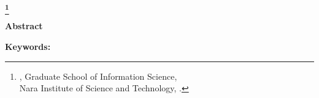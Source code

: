 \begin{center}
 \renewcommand{\thefootnote}{\fnsymbol{footnote}}
 \Large\bfseries \etitle\footnote[1]
 {{\edoctitle}, Graduate School of Information \mbox{Science,}\\
 Nara Institute of Science and Technology, \edate.}
 \renewcommand{\thefootnote}{\arabic{footnote}}
\end{center}
\vspace*{1truemm}
\begin{center}
 \large\eauthor
\end{center}
\vspace*{10truemm}
\begin{center}
 {\bfseries Abstract}
\end{center}
\vspace*{2truemm}
\par
\eabstract
\vspace*{5truemm}
\begin{flushleft}
 {\bfseries Keywords:}
\end{flushleft}\ekeywords
